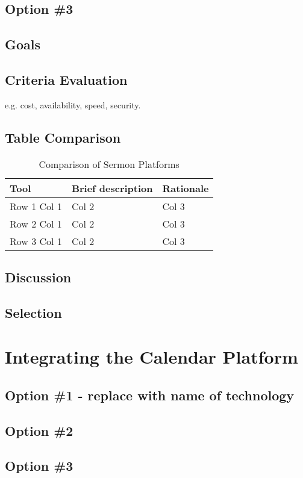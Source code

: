 \documentclass[letterpaper,10pt,draftclsnofoot,onecolumn,titlepage]{IEEEtran}
\begin{document}
	\subsection{Option \#3}
	\subsection{Goals}
	\subsection{Criteria Evaluation}
	e.g. cost, availability, speed, security.
	\subsection{Table Comparison}
	\begin{table}[ht]
	\caption{Comparison of Sermon Platforms}
	\begin{center}
	\begin{tabular} { | m{3cm} | m{5cm} | m{5cm} | }
	\hline\hline
	Tool & Brief description & Rationale \\ [0.5ex]
	\hline
	Row 1 Col 1 & Col 2 & Col 3 \\
	\hline
	Row 2 Col 1 & Col 2 & Col 3 \\
	\hline
	Row 3 Col 1 & Col 2 & Col 3 \\
	\hline
	\end{tabular}
	\end{center}
	\end{table}
	\subsection{Discussion}
	\subsection{Selection}

	\section{Integrating the Calendar Platform}
	\subsection{Option \#1 - replace with name of technology}
	\subsection{Option \#2}
	\subsection{Option \#3}
\end{document}
